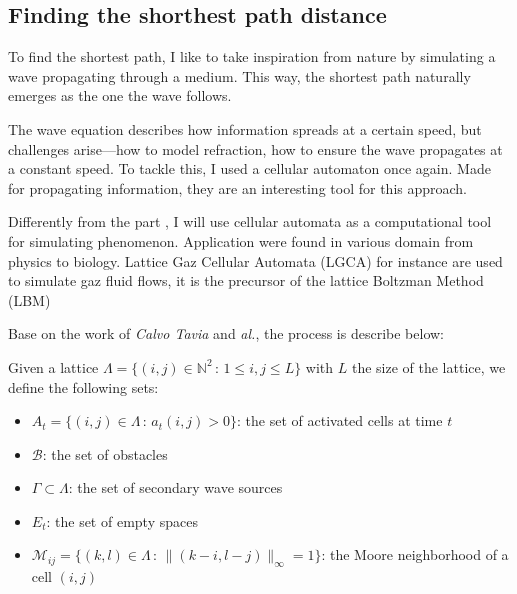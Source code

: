 \documentclass[../main.tex]{subfiles}
\begin{document}
\subsection{Finding the shorthest path distance}
To find the shortest path, I like to take inspiration from nature by simulating a wave propagating through a medium. This way, the shortest path naturally emerges as the one the wave follows.  

\vspace{1em}

The wave equation describes how information spreads at a certain speed, but challenges arise—how to model refraction, how to ensure the wave propagates at a constant speed. To tackle this, I used a cellular automaton once again. Made for propagating information, they are an interesting tool for this approach.\cite{tapia_2016}

\vspace{1em}

Differently from the part \figtonum, I will use cellular automata as a computational tool for simulating phenomenon. Application were found in various domain from physics to biology. Lattice Gaz Cellular Automata (LGCA) for instance are used to simulate gaz fluid flows, it is the precursor of the lattice Boltzman Method (LBM)\cite{chen_1998}

\vspace{1em}

Base on the work of \textit{Calvo Tavia} and \textit{al.}\cite{tapia_2016}, the process is describe below:

\vspace{1em}

Given a lattice $\Lambda = \{(i,j) \in \mathbb{N}^{2} \,:\, 1 \leq i, j \leq L\}$ with $L$ the size of the lattice, we define the following sets:
\vspace{1em}

\begin{itemize}
	\item $A_t = \{ (i, j) \in \Lambda \,:\, a_t(i, j) > 0\}$: the set of activated cells at time $t$
	\item $\mathcal{B}$: the set of obstacles
	\item $\Gamma \subset \Lambda$: the set of secondary wave sources
	\item $E_t$: the set of empty spaces
	\item $\mathcal{M}_{ij} = \{ (k, l) \in \Lambda \,:\, \|(k - i, l - j)\|_{\infty} = 1\}$: the Moore neighborhood of a cell $(i, j)$
\end{itemize}
\end{document}
